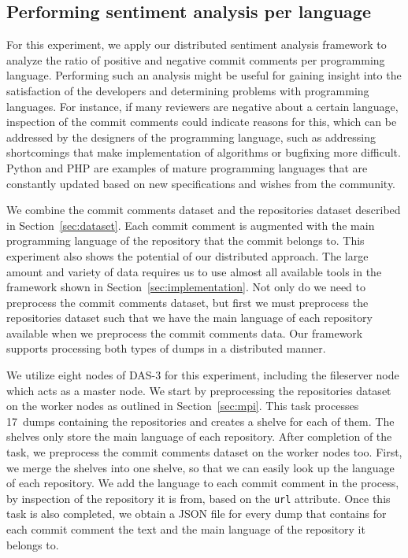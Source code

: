 \documentclass{article}
\begin{document}
\subsection{Performing sentiment analysis per language}\label{sec:sentiment-analysis-per-language}
For this experiment, we apply our distributed sentiment analysis framework to
analyze the ratio of positive and negative commit comments per programming
language. Performing such an analysis might be useful for gaining insight into 
the satisfaction of the developers and determining problems with programming 
languages. For instance, if many reviewers are negative about a certain 
language, inspection of the commit comments could indicate reasons for this, 
which can be addressed by the designers of the programming language, such as 
addressing shortcomings that make implementation of algorithms or bugfixing
more difficult. Python and PHP are examples of mature programming languages
that are constantly updated based on new specifications and wishes from the
community.

We combine the commit comments dataset and the repositories dataset described 
in Section~\ref{sec:dataset}. Each commit comment is augmented with the main 
programming language of the repository that the commit belongs to. This 
experiment also shows the potential of our distributed approach. The large
amount and variety of data requires us to use almost all available tools in the
framework shown in Section~\ref{sec:implementation}. Not only do we need to
preprocess the commit comments dataset, but first we must preprocess the
repositories dataset such that we have the main language of each repository
available when we preprocess the commit comments data. Our framework supports
processing both types of dumps in a distributed manner.

We utilize eight nodes of DAS-3 for this experiment, including the fileserver 
node which acts as a master node. We start by preprocessing the repositories 
dataset on the worker nodes as outlined in Section~\ref{sec:mpi}. This task 
processes 17~dumps containing the repositories and creates a shelve for each of 
them. The shelves only store the main language of each repository. After 
completion of the task, we preprocess the commit comments dataset on the worker 
nodes too. First, we merge the shelves into one shelve, so that we can easily 
look up the language of each repository. We add the language to each commit 
comment in the process, by inspection of the repository it is from, based on 
the {\tt url} attribute. Once this task is also completed, we obtain a JSON 
file for every dump that contains for each commit comment the text and the main 
language of the repository it belongs to.
\end{document}
